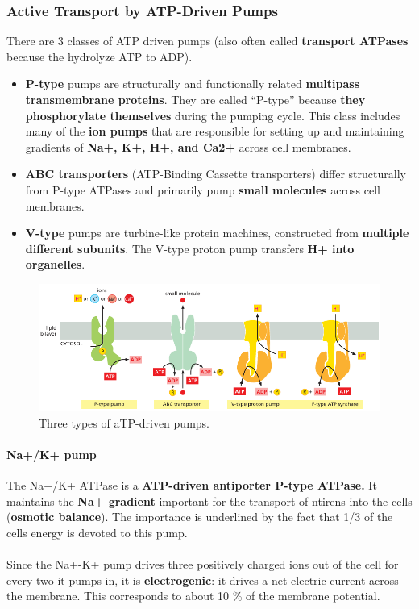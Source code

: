 \documentclass[../main.tex]{subfiles}
\begin{document}
\subsubsection{Active Transport by ATP-Driven Pumps}
There are 3 classes of ATP driven pumps (also often called \textbf{transport ATPases} because the hydrolyze ATP to ADP). 
\begin{itemize}
	\item \textbf{P-type} pumps are structurally and functionally related \textbf{multipass transmembrane proteins}. They are called “P-type” because \textbf{they phosphorylate themselves} during the pumping cycle. This class includes many of the \textbf{ion pumps} that are responsible for setting up and maintaining gradients of \textbf{Na+, K+, H+, and Ca2+} across cell membranes.
	\item \textbf{ABC transporters} (ATP-Binding Cassette transporters) differ structurally from P-type ATPases and primarily pump \textbf{small molecules} across cell membranes.
	\item \textbf{V-type} pumps are turbine-like protein machines, constructed from \textbf{multiple different subunits}. The V-type proton pump transfers \textbf{H+ into organelles}.
\end{itemize}

\begin{figure}[H]
	\centering
	\includegraphics[width = 0.8 \textwidth]{13}
	\caption{Three types of aTP-driven 
		pumps.}
\end{figure}

\paragraph{Na+/K+ pump}
The Na+/K+ ATPase is a \textbf{ATP-driven antiporter P-type ATPase.} It maintains the \textbf{Na+ gradient} important for the transport of ntirens into the cells (\textbf{osmotic balance}). The importance is underlined by the fact that 1/3 of the cells energy is devoted to this pump.\\
\\
Since the Na+-K+ pump drives three positively charged ions out of the cell for every two it pumps in, it is \textbf{electrogenic}: it drives a net electric current across the membrane. This corresponds to about 10 \% of the membrane potential. 
\end{document}

